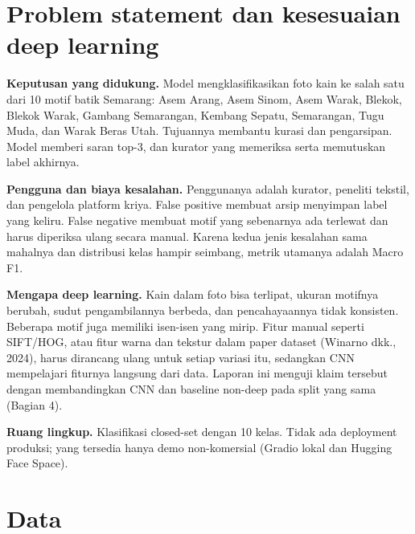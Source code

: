 \documentclass[10pt,a4paper]{article}
\begin{document}
\section{Problem statement dan kesesuaian deep learning}\label{problem-statement-dan-kesesuaian-deep-learning}

\textbf{Keputusan yang didukung.} Model mengklasifikasikan foto kain ke salah satu dari 10 motif batik Semarang: Asem Arang, Asem Sinom, Asem Warak, Blekok, Blekok Warak, Gambang Semarangan, Kembang Sepatu, Semarangan, Tugu Muda, dan Warak Beras Utah. Tujuannya membantu kurasi dan pengarsipan. Model memberi saran top-3, dan kurator yang memeriksa serta memutuskan label akhirnya.

\textbf{Pengguna dan biaya kesalahan.} Penggunanya adalah kurator, peneliti tekstil, dan pengelola platform kriya. False positive membuat arsip menyimpan label yang keliru. False negative membuat motif yang sebenarnya ada terlewat dan harus diperiksa ulang secara manual. Karena kedua jenis kesalahan sama mahalnya dan distribusi kelas hampir seimbang, metrik utamanya adalah Macro F1.

\textbf{Mengapa deep learning.} Kain dalam foto bisa terlipat, ukuran motifnya berubah, sudut pengambilannya berbeda, dan pencahayaannya tidak konsisten. Beberapa motif juga memiliki isen-isen yang mirip. Fitur manual seperti SIFT/HOG, atau fitur warna dan tekstur dalam paper dataset (Winarno dkk., 2024), harus dirancang ulang untuk setiap variasi itu, sedangkan CNN mempelajari fiturnya langsung dari data. Laporan ini menguji klaim tersebut dengan membandingkan CNN dan baseline non-deep pada split yang sama (Bagian 4).

\textbf{Ruang lingkup.} Klasifikasi closed-set dengan 10 kelas. Tidak ada deployment produksi; yang
tersedia hanya demo non-komersial (Gradio lokal dan Hugging Face Space).

\section{Data}\label{data}
\end{document}
